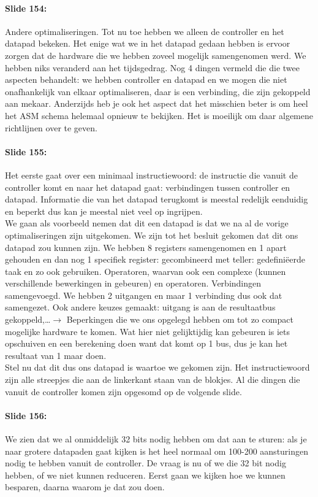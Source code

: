 \documentclass[10pt,a4paper]{book}
\begin{document}
\paragraph{Slide 154:} Andere optimaliseringen. Tot nu toe hebben we alleen de controller en het datapad bekeken. Het enige wat we in het datapad gedaan hebben is ervoor zorgen dat de hardware die we hebben zoveel mogelijk samengenomen werd. We hebben niks veranderd aan het tijdsgedrag. Nog 4 dingen vermeld die die twee aspecten behandelt: we hebben controller en datapad en we mogen die niet onafhankelijk van elkaar optimaliseren, daar is een verbinding, die zijn gekoppeld aan mekaar. Anderzijds heb je ook het aspect dat het misschien beter is om heel het ASM schema helemaal opnieuw te bekijken. Het is moeilijk om daar algemene richtlijnen over te geven.

\paragraph{Slide 155:} Het eerste gaat over een minimaal instructiewoord: de instructie die vanuit de controller komt en naar het datapad gaat: verbindingen tussen controller en datapad. Informatie die van het datapad terugkomt is meestal redelijk eenduidig en beperkt dus kan je meestal niet veel op ingrijpen.\\
We gaan als voorbeeld nemen dat dit een datapad is dat we na al de vorige optimaliseringen zijn uitgekomen. We zijn tot het besluit gekomen dat dit ons datapad zou kunnen zijn. We hebben 8 registers samengenomen en 1 apart gehouden en dan nog 1 specifiek register: gecombineerd met teller: gedefini\"eerde taak en zo ook gebruiken. Operatoren, waarvan ook een complexe (kunnen verschillende bewerkingen in gebeuren) en operatoren. Verbindingen samengevoegd. We hebben 2 uitgangen en maar 1 verbinding dus ook dat samengezet. Ook andere keuzes gemaakt: uitgang is aan de resultaatbus gekoppeld,\ldots $\rightarrow$ Beperkingen die we ons opgelegd hebben om tot zo compact mogelijke hardware te komen. Wat hier niet gelijktijdig kan gebeuren is iets opschuiven en een berekening doen want dat komt op 1 bus, dus je kan het resultaat van 1 maar doen.\\
Stel nu dat dit dus ons datapad is waartoe we gekomen zijn. Het instructiewoord zijn alle streepjes die aan de linkerkant staan van de blokjes. Al die dingen die vanuit de controller komen zijn opgesomd op de volgende slide.

\paragraph{Slide 156:} We zien dat we al onmiddelijk 32 bits nodig hebben om dat aan te sturen: als je naar grotere datapaden gaat kijken is het heel normaal om 100-200 aansturingen nodig te hebben vanuit de controller. De vraag is nu of we die 32 bit nodig hebben, of we niet kunnen reduceren. Eerst gaan we kijken hoe we kunnen besparen, daarna waarom je dat zou doen.
\end{document}
